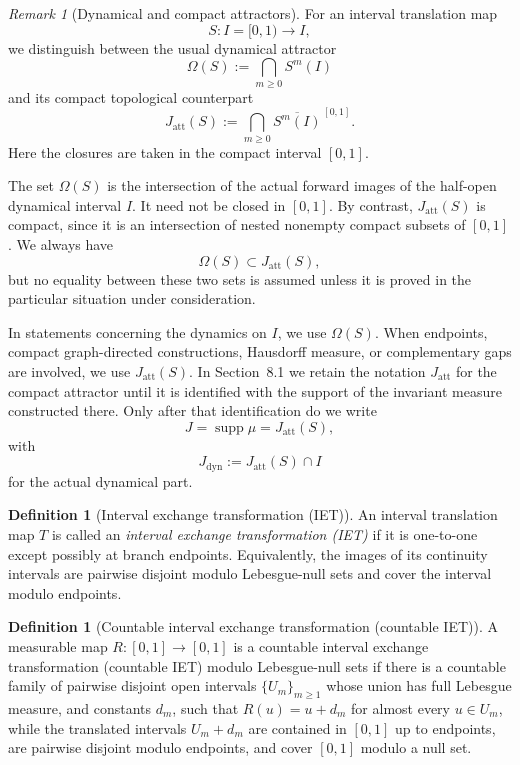 \documentclass[11pt]{amsart}
\theoremstyle{plain}
\theoremstyle{definition}
\newtheorem{definition}[theorem]{Definition}
\theoremstyle{remark}
\newtheorem{remark}[theorem]{Remark}
\DeclareMathOperator{\supp}{supp}
\begin{document}
\begin{remark}[Dynamical and compact attractors]
\label{rem:dynamical-compact-attractors}
For an interval translation map
\[
        S:I=[0,1)\longrightarrow I,
\]
we distinguish between the usual dynamical attractor
\[
        \Omega(S)
        :=
        \bigcap_{m\geq0}S^m(I)
\]
and its compact topological counterpart
\[
        J_{\mathrm{att}}(S)
        :=
        \bigcap_{m\geq0}\overline{S^m(I)}^{\,[0,1]}.
\]
Here the closures are taken in the compact interval \([0,1]\).

The set \(\Omega(S)\) is the intersection of the actual forward images
of the half-open dynamical interval \(I\). It need not be closed in
\([0,1]\). By contrast, \(J_{\mathrm{att}}(S)\) is compact, since it is
an intersection of nested nonempty compact subsets of \([0,1]\). We
always have
\[
        \Omega(S)\subset J_{\mathrm{att}}(S),
\]
but no equality between these two sets is assumed unless it is proved
in the particular situation under consideration.

In statements concerning the dynamics on \(I\), we use
\(\Omega(S)\). When endpoints, compact graph-directed constructions,
Hausdorff measure, or complementary gaps are involved, we use
\(J_{\mathrm{att}}(S)\). In Section~8.1 we retain the notation
\(J_{\mathrm{att}}\) for the compact attractor until it is identified with
the support of the invariant measure constructed there. Only after that identification do we
write
\[
        J=\supp\mu=J_{\mathrm{att}}(S),
\]
with
\[
        J_{\mathrm{dyn}}:=J_{\mathrm{att}}(S)\cap I
\]
for the actual dynamical part.
\end{remark}

\begin{definition}[Interval exchange transformation (IET)]
	An interval translation map \(T\) is called an \emph{interval exchange transformation (IET)}
	if it is one-to-one except possibly at branch endpoints. Equivalently, the
	images of its continuity intervals are pairwise disjoint modulo
	Lebesgue-null sets and cover the interval modulo endpoints.
\end{definition}


\begin{definition}[Countable interval exchange transformation (countable IET)]\label{def:countable-iem}
A measurable map $R:[0,1]\to[0,1]$ is a countable interval exchange transformation (countable IET)
modulo Lebesgue-null sets if there is a countable family of pairwise disjoint open
intervals $\{U_m\}_{m\geq1}$ whose union has full Lebesgue measure, and constants $d_m$,
such that $R(u)=u+d_m$ for almost every $u\in U_m$, while the translated intervals
$U_m+d_m$ are contained in $[0,1]$ up to endpoints, are pairwise disjoint modulo
endpoints, and cover $[0,1]$ modulo a null set.
\end{definition}
\end{document}
